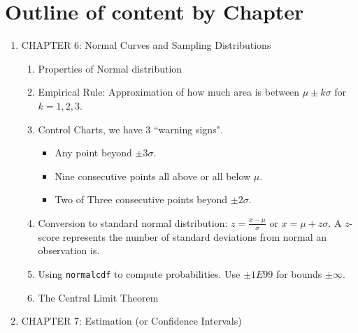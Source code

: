 \documentclass{article}
\begin{document}
\section*{Outline of content by Chapter}

\begin{enumerate}

    \item CHAPTER 6: Normal Curves and Sampling Distributions
    
        \begin{enumerate}
        
        \item Properties of Normal distribution
        
        \item Empirical Rule: Approximation of how much area is between $\mu \pm k\sigma$ for $k=1,2,3$.
        
        \item Control Charts, we have 3 ``warning signs".
        
            \begin{itemize}
            
                \item Any point beyond $\pm 3\sigma$.
                
                \item Nine consecutive points all above or all below $\mu$.
                
                \item Two of Three consecutive points beyond $\pm 2\sigma$.
                
            \end{itemize}
            
        \item Conversion to standard normal distribution: $z=\frac{x-\mu}{\sigma}$ or $x=\mu + z\sigma$. A $z$-score represents the number of standard deviations from normal an observation is.
        
        \item Using \texttt{normalcdf} to compute probabilities. Use $\pm 1 E 99$ for bounds $\pm\infty$.
        
        \item The Central Limit Theorem
        
        \end{enumerate}
        
    \newpage
    
    \item CHAPTER 7: Estimation (or Confidence Intervals)
    

\end{enumerate}
\end{document}
